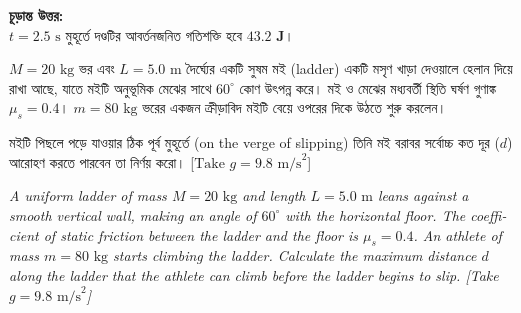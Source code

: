 \documentclass[12pt, a4paper]{article}
\begin{document}
\begin{tcolorbox}[solutionbox={সমাধান (Solution)}]
\vspace{1em}
\begin{tcolorbox}[answerbox]
\textbf{চূড়ান্ত উত্তর:} \\
$t = 2.5\text{ s}$ মুহূর্তে দণ্ডটির আবর্তনজনিত গতিশক্তি হবে $\mathbf{43.2\text{ J}}$।
\end{tcolorbox}
\end{tcolorbox}
\begin{tcolorbox}[questionbox={প্রশ্ন(Question)20 }]
\noindent
$M = 20\text{ kg}$ ভর এবং $L = 5.0\text{ m}$ দৈর্ঘ্যের একটি সুষম মই (ladder) একটি মসৃণ খাড়া দেওয়ালে হেলান দিয়ে রাখা আছে, যাতে মইটি অনুভূমিক মেঝের সাথে $60^\circ$ কোণ উৎপন্ন করে। মই ও মেঝের মধ্যবর্তী স্থিতি ঘর্ষণ গুণাঙ্ক $\mu_s = 0.4$। $m = 80\text{ kg}$ ভরের একজন ক্রীড়াবিদ মইটি বেয়ে ওপরের দিকে উঠতে শুরু করলেন। 

\vspace{0.3em}
\noindent
মইটি পিছলে পড়ে যাওয়ার ঠিক পূর্ব মুহূর্তে (on the verge of slipping) তিনি মই বরাবর সর্বোচ্চ কত দূর ($d$) আরোহণ করতে পারবেন তা নির্ণয় করো। [$\text{Take } g = 9.8\text{ m/s}^2$]

\vspace{0.8em}
\begin{english}
\noindent\textit{\color{darkgray}
A uniform ladder of mass $M = 20\text{ kg}$ and length $L = 5.0\text{ m}$ leans against a smooth vertical wall, making an angle of $60^\circ$ with the horizontal floor. The coefficient of static friction between the ladder and the floor is $\mu_s = 0.4$. An athlete of mass $m = 80\text{ kg}$ starts climbing the ladder. Calculate the maximum distance $d$ along the ladder that the athlete can climb before the ladder begins to slip. [Take $g = 9.8\text{ m/s}^2$]
}
\end{english}
\end{tcolorbox}
\end{document}
